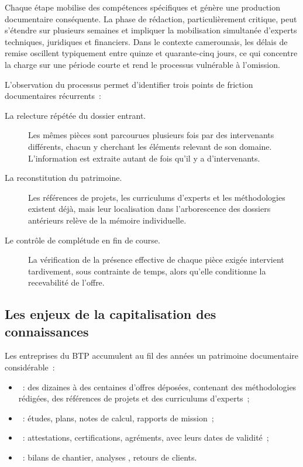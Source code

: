 Chaque étape mobilise des compétences spécifiques et génère une production
documentaire conséquente. La phase de rédaction, particulièrement critique, peut
s'étendre sur plusieurs semaines et impliquer la mobilisation simultanée
d'experts techniques, juridiques et financiers. Dans le contexte camerounais,
les délais de remise oscillent typiquement entre quinze et quarante-cinq jours,
ce qui concentre la charge sur une période courte et rend le processus
vulnérable à l'omission.

L'observation du processus permet d'identifier trois points de friction
documentaires récurrents~:

\begin{description}
  \item[La relecture répétée du dossier entrant.] Les mêmes pièces sont
    parcourues plusieurs fois par des intervenants différents, chacun y
    cherchant les éléments relevant de son domaine. L'information est extraite
    autant de fois qu'il y a d'intervenants.
  \item[La reconstitution du patrimoine.] Les références de projets, les
    curriculums d'experts et les méthodologies existent déjà, mais leur
    localisation dans l'arborescence des dossiers antérieurs relève de la
    mémoire individuelle.
  \item[Le contrôle de complétude en fin de course.] La vérification de la
    présence effective de chaque pièce exigée intervient tardivement, sous
    contrainte de temps, alors qu'elle conditionne la recevabilité de l'offre.
\end{description}

\subsection{Les enjeux de la capitalisation des connaissances}

Les entreprises du BTP accumulent au fil des années un patrimoine documentaire
considérable~:

\begin{itemize}
  \item {}~: des dizaines à des centaines d'offres
        déposées, contenant des méthodologies rédigées, des références de
        projets et des curriculums d'experts~;
  \item {}~: études, plans, notes de calcul,
        rapports de mission~;
  \item {}~: attestations, certifications,
        agréments, avec leurs dates de validité~;
  \item {}~: bilans de chantier, analyses
        , retours de clients.
\end{itemize}

